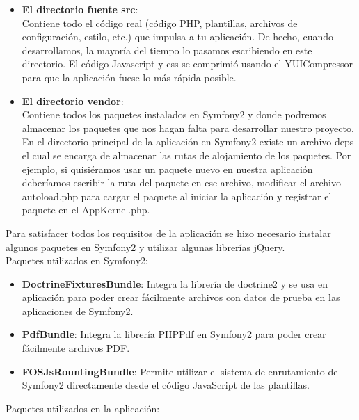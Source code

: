 \begin{itemize}
\item \textbf{El directorio fuente src}: \\

Contiene todo el código real (código PHP, plantillas, archivos de configuración, estilo, etc.) que impulsa a tu aplicación. De hecho, cuando desarrollamos, la mayoría del tiempo lo pasamos escribiendo en este directorio. El código Javascript y css se comprimió usando el YUICompressor para que la aplicación fuese lo más rápida posible.

\item \textbf{El directorio vendor}: \\

Contiene todos los paquetes instalados en Symfony2 y donde podremos almacenar los paquetes que nos hagan falta para desarrollar nuestro proyecto. En el directorio principal de la aplicación en Symfony2 existe un archivo deps el cual se encarga de almacenar las rutas de alojamiento de los paquetes. Por ejemplo, si quisiéramos usar un paquete nuevo en nuestra aplicación deberíamos escribir la ruta del paquete en ese archivo, modificar el archivo autoload.php para cargar el paquete al iniciar la aplicación y registrar el paquete en el AppKernel.php.
\end{itemize}

Para satisfacer todos los requisitos de la aplicación se hizo necesario instalar algunos paquetes en Symfony2 y utilizar algunas librerías jQuery.\\

Paquetes utilizados en Symfony2:

\begin{itemize}
\item \textbf{DoctrineFixturesBundle}: Integra la librería de doctrine2 y se usa en aplicación para poder crear fácilmente archivos con datos de prueba en las aplicaciones de Symfony2.
\item \textbf{PdfBundle}: Integra la librería PHPPdf en Symfony2 para poder crear fácilmente archivos PDF.
\item \textbf{FOSJsRountingBundle}: Permite utilizar el sistema de enrutamiento de Symfony2 directamente desde el código JavaScript de las plantillas.
\end{itemize}

Paquetes utilizados en la aplicación:

